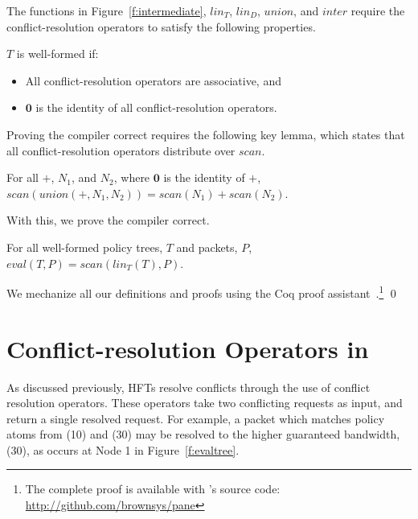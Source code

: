 The functions in Figure~\ref{f:intermediate}, $\mathit{lin}_T$,
$\mathit{lin}_D$, $\mathit{union}$, and $\mathit{inter}$ require the
conflict-resolution operators to satisfy the following properties.
\begin{wftree} 
$T$ is well-formed if:
\begin{itemize}

\item All conflict-resolution operators are associative, and

\item $\textbf{0}$ is the identity of all conflict-resolution operators.
\end{itemize}
\end{wftree}
Proving the compiler correct requires the following key lemma, which
states that all conflict-resolution operators distribute over $\mathit{scan}$.
\begin{unioncommute}
For all $+$, $N_1$, and $N_2$, where $\textbf{0}$ is the identity of $+$,
$\mathit{scan}(\mathit{union}(+,N_1,N_2)) = \mathit{scan}(N_1) +
\mathit{scan}(N_2)$.
\end{unioncommute}
With this, we prove the compiler correct.
\begin{compilercorrect}[Soundness]
For all well-formed policy trees, $T$ and packets, $P$, $\mathit{eval}(T, P) =
\mathit{scan}(\mathit{lin}_T(T), P)$.
\end{compilercorrect}
We mechanize all our definitions and proofs using the Coq proof
assistant~\cite{coq}.\footnote{The complete proof is available with \sys's source code: \url{http://github.com/brownsys/pane}} \qed

\section{Conflict-resolution Operators in \sys}
\label{sec:conflict-resolution-operators}


As discussed previously, HFTs resolve conflicts through the use of conflict resolution operators.
These operators take two conflicting requests as input, and return a single
resolved request. For example, a packet which matches policy atoms from (10)
and (30) may be resolved to the higher guaranteed bandwidth,
(30), as occurs at Node 1 in Figure~\ref{f:evaltree}.

